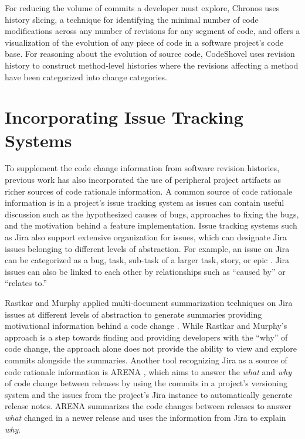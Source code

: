 For reducing the volume of commits a developer must explore, Chronos \cite{servant_history_2012} uses history slicing, a technique for identifying the minimal number of code modifications across any number of revisions for any segment of code, and offers a visualization of the evolution of any piece of code in a software project's code base.
For reasoning about the evolution of source code, CodeShovel \cite{grund_codeshovel_2021} uses revision history to construct method-level histories where the revisions affecting a method have been categorized into change categories.

\section{Incorporating Issue Tracking Systems}

To supplement the code change information from software revision histories, previous work has also incorporated the use of peripheral project artifacts as richer sources of code rationale information. A common source of code rationale information is in a project's issue tracking system as issues can contain useful discussion such as the hypothesized causes of bugs, approaches to fixing the bugs, and the motivation behind a feature implementation. 
Issue tracking systems such as Jira also support extensive organization for issues, which can designate Jira issues belonging to different levels of abstraction.
For example, an issue on Jira can be categorized as a bug, task, sub-task of a larger task, story, or epic \cite{jira-issue-types}.
Jira issues can also be linked to each other by relationships such as ``caused by'' or ``relates to.''

Rastkar and Murphy applied multi-document summarization techniques on Jira issues at different levels of abstraction to generate summaries providing motivational information behind a code change \cite{rastkar_why_2013}.
While Rastkar and Murphy's approach is a step towards finding and providing developers with the ``why'' of code change, the approach alone does not provide the ability to view and explore commits alongside the summaries.
Another tool recognizing Jira as a source of code rationale information is ARENA \cite{moreno_arena_2017}, which aims to answer the \emph{what} and \emph{why} of code change between releases by using the commits in a project's versioning system and the issues from the project's Jira instance to automatically generate release notes. 
ARENA summarizes the code changes between releases to answer \emph{what} changed in a newer release and uses the information from Jira to explain \emph{why}.

